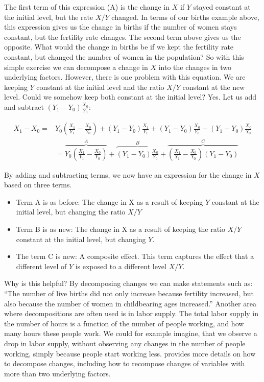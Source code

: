 \documentclass[
]{book}
\providecommand{\tightlist}{%
  \setlength{\itemsep}{0pt}\setlength{\parskip}{0pt}}
\begin{document}
The first term of this expression (A) is the change in \(X\) if \(Y\) stayed constant at the initial level, but the rate \(X/Y\) changed. In terms of our births example above, this expression gives us the change in births if the number of women stays constant, but the fertility rate changes. The second term above gives us the opposite. What would the change in births be if we kept the fertility rate constant, but changed the number of women in the population? So with this simple exercise we can decompose a change in \(X\) into the changes in two underlying factors. However, there is one problem with this equation. We are keeping \(Y\) constant at the initial level and the ratio \(X/Y\) constant at the new level. Could we somehow keep both constant at the initial level? Yes. Let us add and subtract \((Y_1-Y_0)\frac{X_0}{Y_0}\):

\begin{align}
   X_1-X_0=&Y_0\left(\frac{X_1}{Y_1}-\frac{X_0}{Y_0}\right)+(Y_1-Y_0)\frac{X_1}{Y_1}+(Y_1-Y_0)\frac{X_0}{Y_0}-(Y_1-Y_0)\frac{X_0}{Y_0}\nonumber\\
&=\overbrace{Y_0\left(\frac{X_1}{Y_1}-\frac{X_0}{Y_0}\right)}^{A}+\overbrace{\left(Y_1-Y_0\right)\frac{X_0}{Y_0}}^{B}+
  \overbrace{\left(\frac{X_1}{Y_1}-\frac{X_0}{Y_0}\right)\left(Y_1-Y_0\right)}^{C}
 \end{align}

By adding and subtracting terms, we now have an expression for the change in \(X\) based on three terms.

\begin{itemize}
\tightlist
\item
  Term A is as before: The change in X as a result of keeping \(Y\) constant at the initial level, but changing the ratio \(X/Y\)
\item
  Term B is as new: The change in X as a result of keeping the ratio \(X/Y\) constant at the initial level, but changing \(Y\).
\item
  The term C is new: A composite effect. This term captures the effect that a different level of \(Y\) is exposed to a different level \(X/Y\).
\end{itemize}

Why is this helpful? By decomposing changes we can make statements such as: ``The number of live births did not only increase because fertility increased, but also because the number of women in childbearing ages increased.'' Another area where decompositions are often used is in labor supply. The total labor supply in the number of hours is a function of the number of people working, and how many hours these people work. We could for example imagine, that we observe a drop in labor supply, without observing any changes in the number of people working, simply because people start working less. \citep{csr} provides more details on how to decompose changes, including how to recompose changes of variables with more than two underlying factors.
\end{document}
